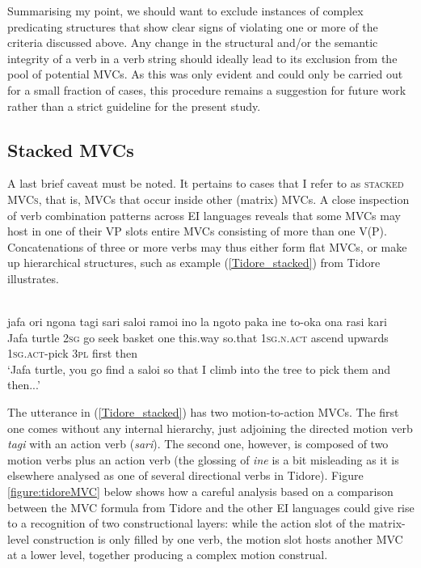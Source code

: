 Summarising my point, we should want to exclude instances of complex predicating structures that show clear signs of violating one or more of the criteria discussed above. Any change in the structural and/or the semantic integrity of a verb in a verb string should ideally lead to its exclusion from the pool of potential MVCs. As this was only evident and could only be carried out for a small fraction of cases, this procedure remains a suggestion for future work rather than a strict guideline for the present study.

\subsection{Stacked MVCs}\label{sec:stackedmvcs}

A last brief caveat must be noted. It pertains to cases that I refer to as \textsc{stacked MVCs}, that is, MVCs that occur inside other (matrix) MVCs. A close inspection of verb combination patterns across EI languages reveals that some MVCs may host in one of their VP slots entire MVCs consisting of more than one V(P). Concatenations of three or more verbs may thus either form flat MVCs, or make up hierarchical structures, such as example (\ref{Tidore_stacked}) from Tidore illustrates.

\ea \label{Tidore_stacked}
\\
\gll jafa ori ngona tagi sari saloi ramoi ino la ngoto paka ine to-oka ona rasi kari \\
Jafa turtle 2\textsc{sg} go seek basket one this.way so.that 1\textsc{sg}.\textsc{n}.\textsc{act} ascend upwards 1\textsc{sg}.\textsc{act}-pick 3\textsc{pl} first then \\
\glft `Jafa turtle, you go find a saloi so that I climb into the tree to pick them and then...' \\ 
\z

The utterance in (\ref{Tidore_stacked}) has two motion-to-action MVCs. The first one comes without any internal hierarchy, just adjoining the directed motion verb \textit{tagi} with an action verb (\textit{sari}). The second one, however, is composed of two motion verbs plus an action verb (the glossing of \textit{ine} is a bit misleading as it is elsewhere analysed as one of several directional verbs in Tidore). Figure \ref{figure:tidoreMVC} below shows how a careful analysis based on a comparison between the MVC formula from Tidore and the other EI languages could give rise to a recognition of two constructional layers: while the action slot of the matrix-level construction is only filled by one verb, the motion slot hosts another MVC at a lower level, together producing a complex motion construal.  

